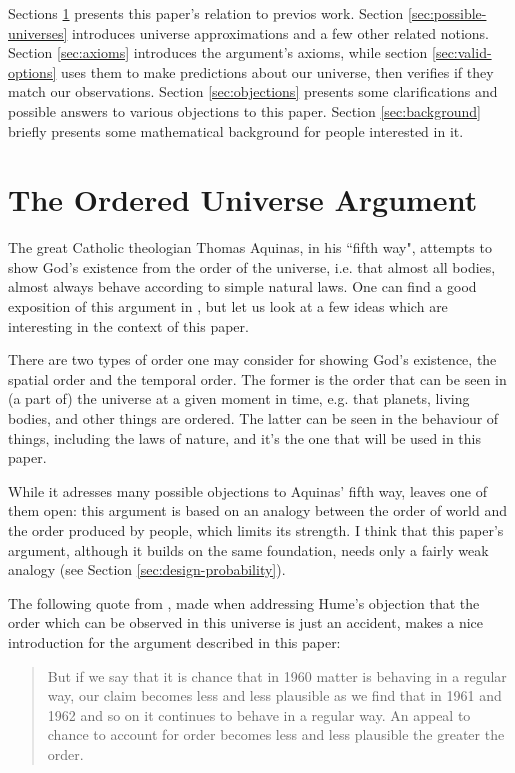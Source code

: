 \documentclass[a4paper
,draft
]{article}
\newcommand{\paper}[1]{paper}
\newcommand{\ghilimele}[1]{``#1"}
\begin{document}
Sections \ref{sec:ordered-universe} presents this paper's relation to
previos work.
Section \ref{sec:possible-universes} introduces universe approximations
and a few other related notions.
Section \ref{sec:axioms} introduces the argument's axioms,
while section \ref{sec:valid-options} uses them to make predictions
about our universe, then verifies if they match our observations.
Section \ref{sec:objections} presents some clarifications and possible
answers to various objections to this paper.
Section \ref{sec:background}
briefly presents some mathematical background for people interested in it.

\section{The Ordered Universe Argument}
\label{sec:ordered-universe}

The great Catholic theologian Thomas Aquinas,
in his \ghilimele{fifth way}, attempts to show God's existence from
the order of the universe, i.e. that almost all bodies, almost always
behave according to simple natural laws.
One can find a good exposition of this argument in
\parencite{swinburne1968}, but let us look at a few ideas which are
interesting in the context of this \paper{}.

There are two types of order one may consider for showing God's existence,
the spatial order and the temporal order.
The former is the order that can be seen in (a part of) the universe
at a given moment in time, e.g. that planets, living bodies, and other things
are ordered.
The latter can be seen in the behaviour of things, including the laws of
nature, and it's the one that will be used in this \paper{}.

While it adresses many possible objections to Aquinas' fifth way,
 leaves one of them open:
this argument is based on an analogy between the order of world and the order
produced by people, which limits its strength.
I think that this \paper{}'s argument, although it builds on the same
foundation, needs only a fairly weak analogy
(see Section \ref{sec:design-probability}).

The following quote from \textcite{swinburne1968}, made when addressing
Hume's objection that the order which can be observed in this universe
is just an accident, makes a nice introduction for the argument
described in this \paper{}:
\begin{quote}
But if we say that it is chance that in 1960 matter is behaving in a
regular way, our claim becomes less and less plausible as we find that in
1961 and 1962 and so on it continues to behave in a regular way. An appeal
to chance to account for order becomes less and less plausible
the greater the order.
\end{quote}
\end{document}
